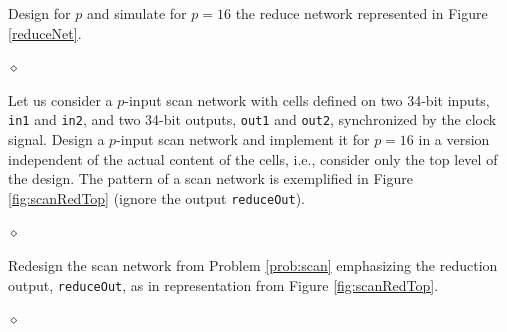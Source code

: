 \begin{problem}
Design for $p$ and simulate for $p=16$ the reduce network represented in Figure \ref{reduceNet}.

$\diamond$
\end{problem}

\begin{problem}\label{prob:scan}
Let us consider a $p$-input scan network with cells defined on two 34-bit inputs, {\tt in1} and {\tt in2}, and two 34-bit outputs, {\tt out1} and {\tt out2}, synchronized by the clock signal. Design a $p$-input scan network and implement it for $p=16$ in a version independent of the actual content of the cells, i.e., consider only the top level of the design. The pattern of a scan network is exemplified in Figure \ref{fig:scanRedTop} (ignore the output {\tt reduceOut}).

$\diamond$
\end{problem}

\begin{problem}
Redesign the scan network from Problem \ref{prob:scan} emphasizing the reduction output, {\tt reduceOut}, as in representation from Figure \ref{fig:scanRedTop}.

$\diamond$
\end{problem}